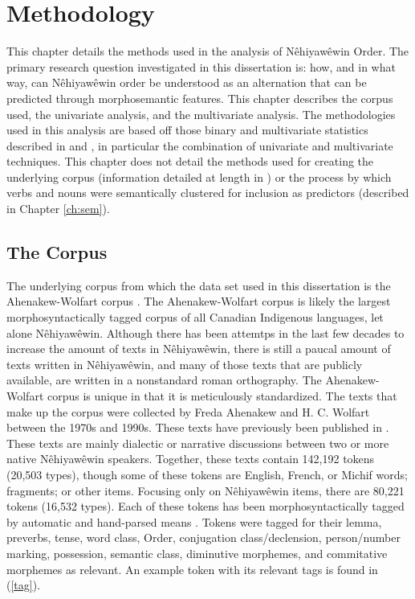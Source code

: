 	\chapter{Methodology}
	\label{ch:method}
This chapter details the methods used in the analysis of Nêhiyawêwin Order. The primary research question investigated in this dissertation is: how, and in what way, can Nêhiyawêwin order be understood as an alternation that can be predicted through morphosemantic features. This chapter describes the corpus used, the univariate analysis, and the multivariate analysis. The methodologies used in this analysis are based off those binary and multivariate statistics described in  \citet{divjak2006ways, bresnan2007predicting, gries2003multifactorial} and \citet{arppe2008univariate}, in particular the combination of univariate and multivariate techniques. This chapter does not detail the methods used for creating the underlying corpus (information detailed at length in \cite{arppe1945morphosyntactically}) or the process by which verbs and nouns were semantically clustered for inclusion as predictors (described in Chapter \ref{ch:sem}).

\section{The Corpus}
The underlying corpus from which the data set used in this dissertation is the Ahenakew-Wolfart corpus \citep{arppe1945morphosyntactically}. The Ahenakew-Wolfart corpus is likely the largest morphosyntactically tagged corpus of all Canadian Indigenous languages, let alone Nêhiyawêwin. Although there has been attemtps in the last few decades to increase the amount of texts in Nêhiyawêwin, there is still a paucal amount of texts written in Nêhiyawêwin, and many of those texts that are publicly available, are written in a nonstandard roman orthography. The Ahenakew-Wolfart corpus is unique in that it is meticulously standardized. The texts that make up the corpus were collected by Freda Ahenakew and H. C. Wolfart between the 1970s and 1990s. These texts have previously been published in \citet{AhenakewAlice2000, Bearetal1992, KaNipitehtew1998, Masuskapoe2010piko, Minde1997kwayask, VandallDouquette1987,Whitecalf1993}. These texts are mainly dialectic or narrative discussions between two or more native Nêhiyawêwin speakers. Together, these texts contain 142,192 tokens (20,503 types), though some of these tokens are English, French, or Michif words; fragments; or other items. Focusing only on Nêhiyawêwin items, there are 80,221 tokens (16,532 types). Each of these tokens has been morphosyntactically tagged by automatic and hand-parsed means \citep{arppe1945morphosyntactically}. Tokens were tagged for their lemma, preverbs, tense, word class, Order, conjugation class/declension, person/number marking, possession, semantic class, diminutive morphemes, and commitative morphemes as relevant. An example token with its relevant tags is found in (\ref{tag}).

